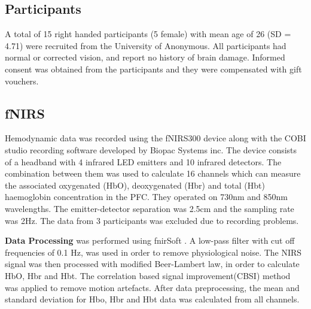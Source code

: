 \documentclass[../main/Feedback.tex]{subfiles}
\begin{document}
\subsection{Participants}
A total of 15 right handed participants (5 female) with mean age of 26 (SD = 4.71) were recruited from the University of Anonymous.
All participants had normal or corrected vision, and report no history of brain damage.
Informed consent was obtained from the participants and they were compensated with gift vouchers.

\subsection{fNIRS}
Hemodynamic data was recorded using the fNIRS300 device along with the COBI studio recording software developed by Biopac Systems inc.
The device consists of a headband with 4 infrared LED emitters and 10 infrared detectors.
The combination between them was used to calculate 16 channels which can measure the associated oxygenated (HbO), deoxygenated (Hbr) and total (Hbt) haemoglobin concentration in the PFC.
They operated on 730nm and 850nm wavelengths.
The emitter-detector separation was 2.5cm and the sampling rate was 2Hz.
The data from 3 participants was excluded due to recording problems.

\textbf{Data Processing} was performed using fnirSoft \cite{ayazfunctional}. 
A low-pass filter with cut off frequencies of 0.1 Hz, was used in order to remove physiological noise.
The NIRS signal was then processed with modified Beer-Lambert law\cite{cope1988system}, in order to calculate HbO, Hbr and Hbt.  
The correlation based signal improvement(CBSI) \cite{cui2010functional} method was applied to remove motion artefacts.
After data preprocessing, the mean and standard deviation for Hbo, Hbr and Hbt data was calculated from all channels.
\end{document}

